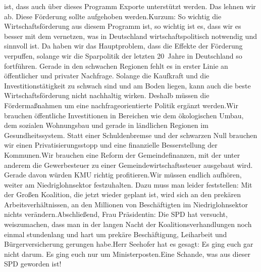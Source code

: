 \documentclass{article}
\begin{document}
ist, dass auch über dieses Programm Exporte unterstützt werden. Das lehnen wir ab. Diese Förderung sollte aufgehoben werden.Kurzum: So wichtig die Wirtschaftsförderung aus diesem Programm ist, so wichtig ist es, dass wir es besser mit dem vernetzen, was in Deutschland wirtschaftspolitisch notwendig und sinnvoll ist. Da haben wir das Hauptproblem, dass die Effekte der Förderung verpuffen, solange wir die Sparpolitik der letzten 20 Jahre in Deutschland so fortführen. Gerade in den schwachen Regionen fehlt es in erster Linie an öffentlicher und privater Nachfrage. Solange die Kaufkraft und die Investitionstätigkeit zu schwach sind und am Boden liegen, kann auch die beste Wirtschaftsförderung nicht nachhaltig wirken. Deshalb müssen die Fördermaßnahmen um eine nachfrageorientierte Politik ergänzt werden.Wir brauchen öffentliche Investitionen in Bereichen wie dem ökologischen Umbau, dem sozialen Wohnungsbau und gerade in ländlichen Regionen im Gesundheitssystem. Statt einer Schuldenbremse und der schwarzen Null brauchen wir einen Privatisierungsstopp und eine finanzielle Besserstellung der Kommunen.Wir brauchen eine Reform der Gemeindefinanzen, mit der unter anderem die Gewerbesteuer zu einer Gemeindewirtschaftssteuer ausgebaut wird. Gerade davon würden KMU richtig profitieren.Wir müssen endlich aufhören, weiter am Niedriglohnsektor festzuhalten. Dazu muss man leider feststellen: Mit der Großen Koalition, die jetzt wieder geplant ist, wird sich an den prekären Arbeitsverhältnissen, an den Millionen von Beschäftigten im Niedriglohnsektor nichts verändern.Abschließend, Frau Präsidentin: Die SPD hat versucht, weiszumachen, dass man in der langen Nacht der Koalitionsverhandlungen noch einmal stundenlang und hart um prekäre Beschäftigung, Leiharbeit und Bürgerversicherung gerungen habe.Herr Seehofer hat es gesagt: Es ging euch gar nicht darum. Es ging euch nur um Ministerposten.Eine Schande, was aus dieser SPD geworden ist!
\end{document}
